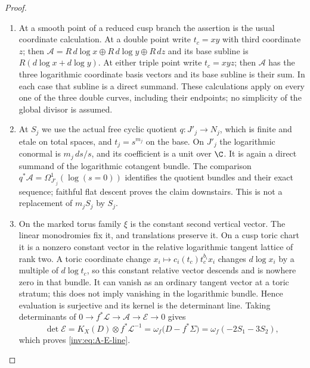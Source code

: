 \begin{proof}
\begin{enumerate}[label=\arabic*.,leftmargin=*]
\item At a smooth point of a reduced cusp branch the assertion is the usual
coordinate calculation.  At a double point write $t_c=xy$ with third
coordinate $z$; then
$\mathcal A=R\,d\log x\oplus R\,d\log y\oplus R\,dz$ and its
base subline is $R(d\log x+d\log y)$.  At either triple point write
$t_c=xyz$; then $\mathcal A$ has the three logarithmic coordinate
basis vectors and its base subline is their sum.  In each case that
subline is a direct summand.  These calculations apply on every one
of the three double curves, including their endpoints; no simplicity
of the global divisor is assumed.

\item At $S_j$ we use the actual free cyclic quotient
$q:J'_j\to N_j$, which is finite and etale on total spaces, and
$t_j=s^{m_j}$ on the base.  On $J'_j$ the logarithmic conormal is
$m_j\,ds/s$, and its coefficient is a unit over $\C$.  It is again a
direct summand of the logarithmic cotangent bundle.  The comparison
$q^*\mathcal A=\Omega_{J'_j}^1(\log(s=0))$ identifies the quotient
bundles and their exact sequence; faithful flat descent proves the
claim downstairs.  This is not a replacement of $m_jS_j$ by $S_j$.

\item On the marked torus family $\xi$ is the constant second vertical
vector.  The linear monodromies fix it, and translations preserve it.
On a cusp toric chart it is a nonzero constant vector in the relative
logarithmic tangent lattice of rank two.  A toric coordinate change
$x_i\mapsto c_i(t_c)t_c^{b_i}x_i$ changes $d\log x_i$ by a multiple
of $d\log t_c$, so this constant relative vector descends and is
nowhere zero in that bundle.  It can vanish as an ordinary tangent
vector at a toric stratum; this does not imply vanishing in the
logarithmic bundle.  Hence evaluation is surjective and its kernel
is the determinant line.  Taking determinants of
$0\to f^*\mathcal L\to\mathcal A\to\mathcal E\to0$ gives
\[
\det\mathcal E=K_X(D)\otimes f^*\mathcal L^{-1}
=\omega_f\bigl(D-f^*\Sigma\bigr)
=\omega_f(-2S_1-3S_2),
\]
which proves \eqref{inv:eq:A-E-line}.
\end{enumerate}
\end{proof}

